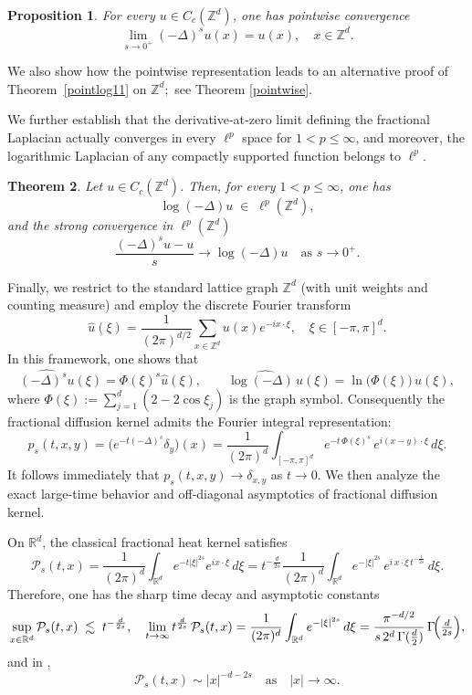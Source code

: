 \documentclass[reqno,12pt]{amsart}
\numberwithin{equation}{section}
\newtheorem{theorem}{Theorem}[section]
\newtheorem{proposition}[theorem]{Proposition}
\begin{document}
\begin{proposition}\label{slx11111}
	For every \(u\in C_c(\mathbb{Z}^d)\), one has pointwise convergence
	\[
	\lim_{s\to0^+}(-\Delta)^s u(x) = u(x),
	\quad x\in \mathbb{Z}^d.
	\]
\end{proposition}


We also show how the pointwise representation leads to an alternative proof of Theorem~\ref{pointlog11} on $\mathbb{Z}^d;$ see Theorem \ref{pointwise}.

We further establish that the derivative‐at‐zero limit defining the fractional Laplacian actually converges in every $\ell^p$ space for $1<p\le\infty$, and moreover, the logarithmic Laplacian of any compactly supported function belongs to $\ell^p$.

\begin{theorem}\label{thm:lplimit11}
	Let \(u\in C_c(\mathbb{Z}^d)\).  Then, for every \(1<p\le\infty\), one has
	\[
\log\left(-\Delta\right)u
	\;\in\;\ell^p(\mathbb{Z}^d),\]
	and the strong convergence in $\ell^p\left(\mathbb{Z}^d\right)$
	\[\frac{(-\Delta)^s u - u}{s}\longrightarrow
\log\left(-\Delta\right)u
	\quad\text{as }s\to0^+.
	\]
\end{theorem}

Finally, we restrict to the standard lattice graph \(\mathbb{Z}^d\) (with unit weights and counting measure) and employ the discrete Fourier transform
\[
\widehat u(\xi)=\frac1{(2\pi)^{d/2}}\sum_{x\in\mathbb{Z}^d}u(x)e^{-i x\cdot\xi}, 
\quad \xi\in[-\pi,\pi]^d.
\]
In this framework, one shows that
\[
\widehat{(-\Delta)^su}(\xi)=\Phi(\xi)^s\widehat u(\xi),
\qquad
\widehat{\log(-\Delta)\,u}(\xi)=\ln\bigl(\Phi(\xi)\bigr)\,\widehat u(\xi),
\]
where \(\Phi(\xi):=\sum_{j=1}^d(2-2\cos\xi_j)\) is the graph symbol.  Consequently the fractional diffusion kernel admits the Fourier integral representation:
\[
p_s(t,x,y)
=\bigl(e^{-t(-\Delta)^s}\delta_y\bigr)(x)
=\frac1{(2\pi)^d}
\int_{[-\pi,\pi]^d}e^{-t\,\Phi(\xi)^s}\,e^{i(x-y)\cdot\xi}\,d\xi.
\]
It follows immediately that \(p_s(t,x,y)\to\delta_{x,y}\) as \(t\to0\).  We then analyze the exact large-time behavior and off-diagonal asymptotics of fractional diffusion kernel.

On \(\mathbb{R}^d\), the classical fractional heat kernel satisfies
\[
\mathcal P_s(t,x)
=\frac{1}{(2\pi)^d}\int_{\mathbb{R}^d}e^{-t|\xi|^{2s}}e^{i x\cdot\xi}\,d\xi
=t^{-\frac{d}{2s}}
\frac{1}{(2\pi)^d}
\int_{\mathbb{R}^d}e^{-|\xi|^{2s}}\,e^{i\,x\cdot \xi\,t^{-\frac{1}{2s}}}\,d\xi.
\]
Therefore, one has the sharp time decay and asymptotic constants 
\[
\sup_{x\in \mathbb{R}^d}\mathcal P_s(t,x)\;\lesssim\;t^{-\frac{d}{2s}},
\quad
\lim_{t\to\infty}t^{\frac{d}{2s}}\,
\mathcal P_s(t,x)
=\frac{1}{(2\pi)^d}\int_{\mathbb{R}^d}e^{-|\xi|^{2s}}\,d\xi
=\frac{\pi^{-d/2}}{s\,2^d\,\Gamma(\tfrac d2)}\,
\Gamma\!\Bigl(\tfrac{d}{2s}\Bigr),
\]
and in \cite[Theorem 2.1]{blumenthal1960some}, 
\[\mathcal P_s(t,x) \sim |x|^{-d-2s}\quad\text{as}\quad |x|\rightarrow\infty.\]
\end{document}
